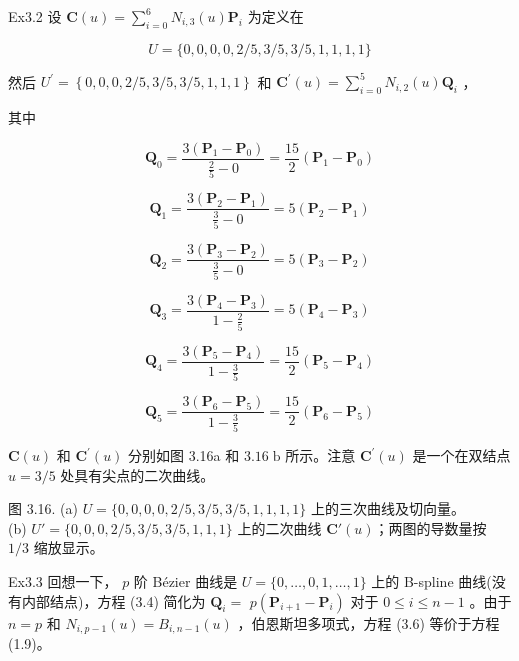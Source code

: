 \documentclass[../main.tex]{subfiles}
\begin{document}
Ex3.2 设 \(\mathbf{C}\left( u\right)  = \mathop{\sum }\limits_{{i = 0}}^{6}{N}_{i,3}\left( u\right) {\mathbf{P}}_{i}\) 为定义在

\[
U = \{ 0,0,0,0,2/5,3/5,3/5,1,1,1,1\}
\]

然后 \({U}^{\prime } = \left\{  {0,0,0,2/5,3/5,3/5,1,1,1}\right\}\) 和 \({\mathbf{C}}^{\prime }\left( u\right)  = \mathop{\sum }\limits_{{i = 0}}^{5}{N}_{i,2}\left( u\right) {\mathbf{Q}}_{i}\) ，

其中

\[
\mathbf Q_{0}=\frac{3\left(\mathbf P_{1}-\mathbf P_{0}\right)}{\frac25-0}=\frac{15}{2}\left(\mathbf P_{1}-\mathbf P_{0}\right)
\]

\[
\mathbf Q_{1}=\frac{3\left(\mathbf P_{2}-\mathbf P_{1}\right)}{\frac35-0}=5\left(\mathbf P_{2}-\mathbf P_{1}\right)
\]

\[
\mathbf Q_{2}=\frac{3\left(\mathbf P_{3}-\mathbf P_{2}\right)}{\frac35-0}=5\left(\mathbf P_{3}-\mathbf P_{2}\right)
\]

\[
\mathbf Q_{3}=\frac{3\left(\mathbf P_{4}-\mathbf P_{3}\right)}{1-\frac25}=5\left(\mathbf P_{4}-\mathbf P_{3}\right)
\]

\[
\mathbf Q_{4}=\frac{3\left(\mathbf P_{5}-\mathbf P_{4}\right)}{1-\frac35}=\frac{15}{2}\left(\mathbf P_{5}-\mathbf P_{4}\right)
\]

\[
\mathbf Q_{5}=\frac{3\left(\mathbf P_{6}-\mathbf P_{5}\right)}{1-\frac35}=\frac{15}{2}\left(\mathbf P_{6}-\mathbf P_{5}\right)
\]

\(\mathbf{C}\left( u\right)\) 和 \({\mathbf{C}}^{\prime }\left( u\right)\) 分别如图 3.16a 和 \({3.16}\mathrm{\;b}\) 所示。注意 \({\mathbf{C}}^{\prime }\left( u\right)\) 是一个在双结点 \(u = 3/5\) 处具有尖点的二次曲线。

\begin{center}
\begin{minipage}{18cm}
\vspace*{.6\baselineskip}
\centering
{}
\par\medskip
{}
\par\smallskip
图 3.16. (a) \(U=\{0,0,0,0,2/5,3/5,3/5,1,1,1,1\}\) 上的三次曲线及切向量。\\ (b) \(U'=\{0,0,0,2/5,3/5,3/5,1,1,1\}\) 上的二次曲线 \(\mathbf C'(u)\)；两图的导数量按 \(1/3\) 缩放显示。
\end{minipage}
\end{center}


Ex3.3 回想一下， \(p\) 阶 Bézier 曲线是 \(U = \{ 0,\ldots ,0,1,\ldots ,1\}\) 上的 B-spline 曲线(没有内部结点)，方程 (3.4) 简化为 \({\mathbf{Q}}_{i} =\)  \(p\left( {{\mathbf{P}}_{i + 1} - {\mathbf{P}}_{i}}\right)\) 对于 \(0 \leq  i \leq  n - 1\) 。由于 \(n = p\) 和 \({N}_{i,p - 1}\left( u\right)  = {B}_{i,n - 1}\left( u\right)\) ，伯恩斯坦多项式，方程 (3.6) 等价于方程 (1.9)。
\end{document}
